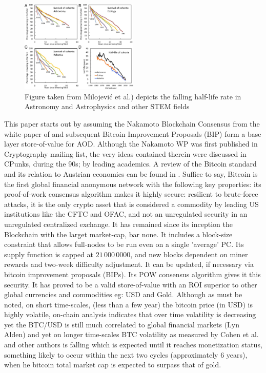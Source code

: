 \documentclass[final,5p,times,twocolumn,authoryear]{elsarticle}
\begin{document}
\begin{figure}[h!]
    \centering
    \label{fig:F4.large}
  \caption{Figure taken from Milojević et al.) depicts the falling half-life rate in Astronomy and Astrophysics and other STEM fields}
  \includegraphics[width=0.5\textwidth]{figs/F4.large.jpg}
\end{figure}
This paper starts out by assuming the Nakamoto Blockchain Consensus from the white-paper of \cite{nak2009} and subsequent Bitcoin Improvement Proposals (BIP) form a base layer store-of-value for AOD. Although the Nakamoto WP was first published in Cryptography mailing list, the very ideas contained therein were discussed in CPunks, during the 90s; by leading academics. A review of the Bitcoin standard and its relation to Austrian economics can be found in \citet{Hansen2020Book}. Suffice to say, Bitcoin is the first global financial anonymous network with the following key properties: its proof-of-work consensus algorithm makes it highly secure: resilient to brute-force attacks, it is the only crypto asset that is considered a commodity by leading US institutions like the CFTC and OFAC, and not an unregulated security in an unregulated centralized exchange. It has remained since its inception the Blockchain with the larget market-cap, bar none. It includes a block-size constraint that allows full-nodes to be run even on a single 'average' PC. Its supply function is capped at $21\,000\,0000$, and new blocks dependent on miner rewards and two-week difficulty adjustment. It can be updated, if necessary via bitcoin improvement proposals (BIPs). Its POW consensus algorithm gives it this security. It has proved to be a valid store-of-value with an ROI superior to other global currencies and commodities eg: USD and Gold. Although as must be noted, on short time-scales, (less than a few year) the bitcoin price (in USD) is highly volatile, on-chain analysis indicates that over time volatility is decreasing yet the BTC/USD is still much correlated to global financial markets (Lyn Alden) and yet on longer time-scales BTC volatility as measured by Cohen et al. and other authors is falling which is expected until it reaches monetization status, something likely to occur within the next two cycles (approximately 6 years), when he bitcoin total market cap is expected to surpass that of gold. 
\end{document}
